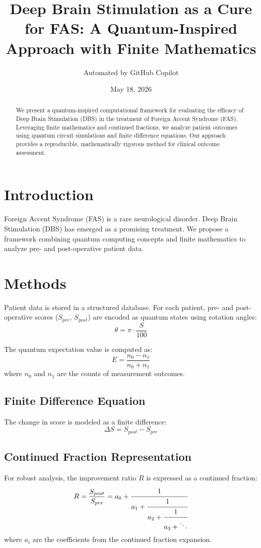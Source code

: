 \documentclass[12pt]{article}
\title{Deep Brain Stimulation as a Cure for FAS: A Quantum-Inspired Approach with Finite Mathematics}
\author{Automated by GitHub Copilot}
\date{May 18, 2026}
\begin{document}
\maketitle

\begin{abstract}
We present a quantum-inspired computational framework for evaluating the efficacy of Deep Brain Stimulation (DBS) in the treatment of Foreign Accent Syndrome (FAS). Leveraging finite mathematics and continued fractions, we analyze patient outcomes using quantum circuit simulations and finite difference equations. Our approach provides a reproducible, mathematically rigorous method for clinical outcome assessment.
\end{abstract}

\section{Introduction}
Foreign Accent Syndrome (FAS) is a rare neurological disorder. Deep Brain Stimulation (DBS) has emerged as a promising treatment. We propose a framework combining quantum computing concepts and finite mathematics to analyze pre- and post-operative patient data.

\section{Methods}
Patient data is stored in a structured database. For each patient, pre- and post-operative scores ($S_{pre}$, $S_{post}$) are encoded as quantum states using rotation angles:
\begin{equation}
\theta = \pi \cdot \frac{S}{100}
\end{equation}

The quantum expectation value is computed as:
\begin{equation}
E = \frac{n_0 - n_1}{n_0 + n_1}
\end{equation}
where $n_0$ and $n_1$ are the counts of measurement outcomes.

\subsection{Finite Difference Equation}
The change in score is modeled as a finite difference:
\begin{equation}
\Delta S = S_{post} - S_{pre}
\end{equation}

\subsection{Continued Fraction Representation}
For robust analysis, the improvement ratio $R$ is expressed as a continued fraction:
\begin{equation}
R = \frac{S_{post}}{S_{pre}} = a_0 + \cfrac{1}{a_1 + \cfrac{1}{a_2 + \cfrac{1}{a_3 + \ddots}}}
\end{equation}
where $a_i$ are the coefficients from the continued fraction expansion.
\end{document}
